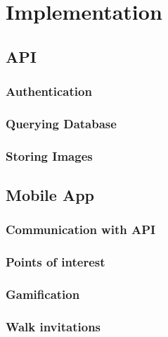 \chapter{Implementation}


\section{API}

\subsection{Authentication}

\subsection{Querying Database}

\subsection{Storing Images} \label{implentation:storing-images}


\section{Mobile App}

\subsection{Communication with API}

\subsection{Points of interest}

\subsection{Gamification}

\subsection{Walk invitations}